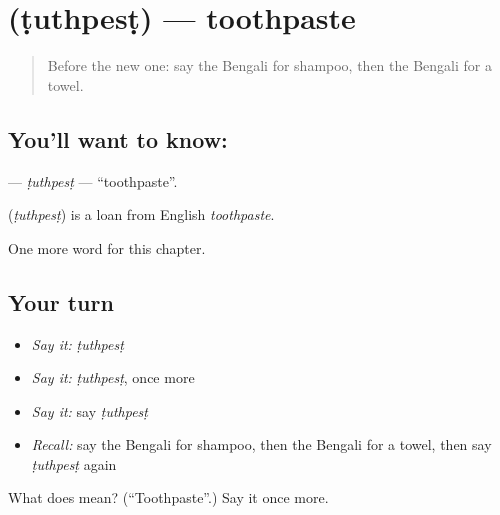 \section[\texorpdfstring{\bn{টুথপেস্ট} (ṭuthpesṭ)}{টুথপেস্ট (ṭuthpesṭ)}]{ (ṭuthpesṭ) — toothpaste}

\label{lesson:BN-C163-tuthpest}



\begin{quote}
Before the new one: say the Bengali for shampoo, then the Bengali for a towel.
\end{quote}

\subsection*{You'll want to know: }
\textbf{} — \emph{ṭuthpesṭ} — \textquotedblleft{}toothpaste\textquotedblright{}.

\begin{cousinweb}
\textbf{} (\emph{ṭuthpesṭ}) is a loan from English \emph{toothpaste}.
\end{cousinweb}

\begin{grammarlens}[title={What you've built}]
One more word for this chapter.
\end{grammarlens}

\subsection*{Your turn}
\begin{itemize}
\raggedright
  \item \emph{Say it:} \emph{ṭuthpesṭ}
  \item \emph{Say it:} \emph{ṭuthpesṭ}, once more
  \item \emph{Say it:} say \emph{ṭuthpesṭ}
  \item \emph{Recall:} say the Bengali for shampoo, then the Bengali for a towel, then say \emph{ṭuthpesṭ} again
\end{itemize}

\begin{tcolorbox}[breakable,colback=teal!4,colframe=teal!35!black,title={Before you move on}]
What does  mean? (\textquotedblleft{}Toothpaste\textquotedblright{}.) Say it once more.
\end{tcolorbox}
